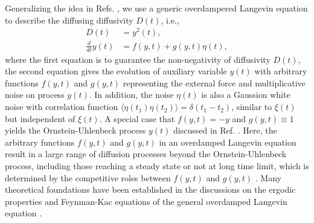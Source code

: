 \documentclass[aps,pre,twocolumn,groupedaddress,longbibliography]{revtex4-2}
\begin{document}
Generalizing the idea in Refs. \cite{ChubynskySlater:2014,ChechkinSenoMetzlerSokolov:2017}, we use a generic overdampered Langevin equation to describe the diffusing diffusivity $D(t)$, i.e.,
\begin{equation}\label{model-DD}
\begin{split}
D(t)&=y^2(t),\\
\frac{d}{d t}y(t)&=f(y,t)+g(y,t) \eta(t),
\end{split}
\end{equation}
where the first equation is to guarantee the non-negativity of diffusivity $D(t)$, the second equation gives the evolution of auxiliary variable $y(t)$ with arbitrary functions $f(y,t)$ and $g(y,t)$ representing the external force and multiplicative noise on process $y(t)$. In addition, the noise $\eta(t)$ is also a Gaussion white noise with correlation function $\langle \eta(t_1)\eta(t_2)\rangle=\delta(t_1-t_2)$, similar to $\xi(t)$ but independent of $\xi(t)$. A special case that $f(y,t)=-y$ and $g(y,t)\equiv1$ yields the Ornstein-Uhlenbeck process $y(t)$ discussed in Ref. \cite{ChechkinSenoMetzlerSokolov:2017}.
Here, the arbitrary functions $f(y,t)$ and $g(y,t)$ in an overdamped Langevin equation result in a large range of diffusion processes beyond the Ornstein-Uhlenbeck process, including those reaching a steady state or not at long time limit, which is determined by the competitive roles between $f(y,t)$ and $g(y,t)$ \cite{WangDengChen:2019}. Many theoretical foundations have been established in the discussions on the ergodic properties and Feynman-Kac equations of the general overdamped Langevin equation \cite{WangDengChen:2019,WangChenDeng:2018,CairoliBaule:2017}.
\end{document}
